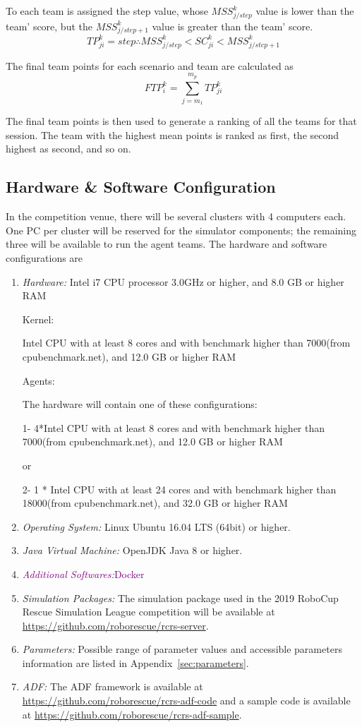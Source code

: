 \documentclass{article}
\begin{document}
To each team is assigned the step value, whose $MSS_{j/step}^{k}$ value is lower than the team' score, but the $MSS_{j/step+1}^{k}$ value is greater than the team' score.
\begin{equation}
TP_{ji}^{k} = step \therefore MSS_{j/step}^{k} < SC_{ji}^{k} < MSS_{j/step+1}^{k}
\end{equation}

The final team points for each scenario and team are calculated as
\begin{equation}
FTP_{i}^{k} = \sum_{j=m_{1}}^{m_{p}}{TP_{ji}^{k}}
\end{equation}

The final team points is then used to generate a ranking of all the teams for that session. The team with the highest mean points is ranked as first, the second highest as second, and so on.
\subsection{Hardware \& Software Configuration}
In the competition venue, there will be several clusters with 4 computers each. One PC per cluster will be reserved for the simulator components; the remaining three will be available to run the agent teams. The hardware and software configurations are
\begin{enumerate}[ ]
\item \emph{Hardware:} Intel i7 CPU processor 3.0GHz or higher, and 8.0 GB or higher RAM
{\color{purple}

Kernel: 

	Intel CPU with at least 8 cores and with benchmark higher than 7000(from cpubenchmark.net), and 12.0 GB or higher RAM
	
Agents:

The hardware will contain one of these configurations:

1- 4*Intel CPU with at least 8 cores and with benchmark higher than 7000(from cpubenchmark.net), and 12.0 GB or higher RAM

or

2- 1 * Intel CPU with at least 24 cores and with benchmark higher than 18000(from cpubenchmark.net), and 32.0 GB or higher RAM

}
\item \emph{Operating System:} Linux Ubuntu 16.04 LTS (64bit) or higher.
\item \emph{Java Virtual Machine:} OpenJDK Java 8 or higher.
\item \textcolor{purple}{\emph{Additional Softwares:}Docker}
\item \emph{Simulation Packages:} The simulation package used in the 2019 RoboCup Rescue Simulation League competition will be available at \url{https://github.com/roborescue/rcrs-server}.
\item \emph{Parameters:} Possible range of parameter values and accessible parameters information are listed in Appendix~\ref{sec:parameters}.
\item \emph{ADF:} The ADF framework is available at \url{https://github.com/roborescue/rcrs-adf-code} and a sample code is available at \url{https://github.com/roborescue/rcrs-adf-sample}.
\end{enumerate}
\end{document}
